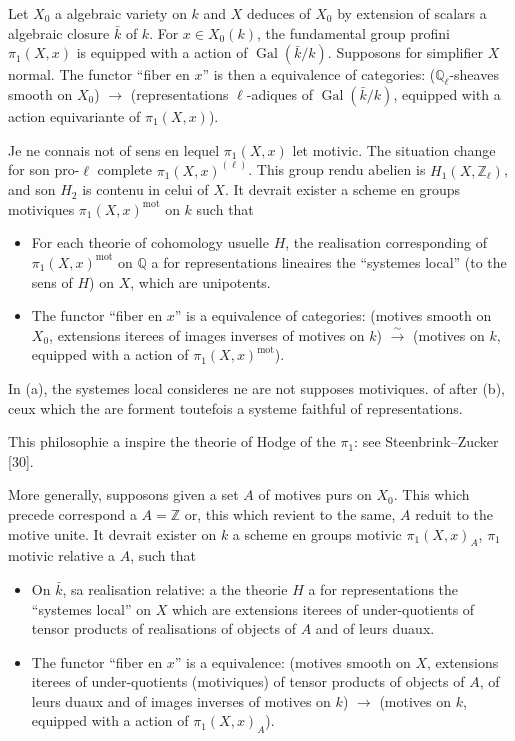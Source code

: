 \documentclass[11pt,a4paper]{article}
\theoremstyle{plain}
\theoremstyle{definition}
\DeclareMathOperator{\Gal}{Gal}
\newcommand{\Q}{\mathbb{Q}}
\newcommand{\Z}{\mathbb{Z}}
\DeclareMathOperator{\mot}{mot}
\begin{document}
Let $X_0$ a algebraic variety on $k$ and $X$ deduces of $X_0$ by extension of scalars a algebraic closure $\bar{k}$ of $k$. For $x \in X_0(k)$, the fundamental group profini $\pi_1(X, x)$ is equipped with a action of $\Gal(\bar{k}/k)$. Supposons for simplifier $X$ normal. The functor ``fiber en $x$'' is then a equivalence of categories: ($\Q_{\ell}$-sheaves smooth on $X_0$) $\to$ (representations $\ell$-adiques of $\Gal(\bar{k}/k)$, equipped with a action equivariante of $\pi_1(X, x)$).

Je ne connais not of sens en lequel $\pi_1(X, x)$ let motivic. The situation change for son pro-$\ell$ complete $\pi_1(X, x)^{(\ell)}$. This group rendu abelien is $H_1(X, \Z_\ell)$, and son $H_2$ is contenu in celui of $X$. It devrait exister a scheme en groups motiviques $\pi_1(X, x)^{\mot}$ on $k$ such that

\begin{itemize}
\item[(a)] For each theorie of cohomology usuelle $H$, the realisation corresponding of $\pi_1(X, x)^{\mot}$ on $\Q$ a for representations lineaires the ``systemes local'' (to the sens of $H$) on $X$, which are unipotents.

\item[(b)] The functor ``fiber en $x$'' is a equivalence of categories: (motives smooth on $X_0$, extensions iterees of images inverses of motives on $k$) $\xrightarrow{\sim}$ (motives on $k$, equipped with a action of $\pi_1(X, x)^{\mot}$).
\end{itemize}

In (a), the systemes local consideres ne are not supposes motiviques. of after (b), ceux which the are forment toutefois a systeme faithful of representations.

This philosophie a inspire the theorie of Hodge of the $\pi_1$: see Steenbrink--Zucker [30].

More generally, supposons given a set $A$ of motives purs on $X_0$. This which precede correspond a $A = \Z$ or, this which revient to the same, $A$ reduit to the motive unite. It devrait exister on $k$ a scheme en groups motivic $\pi_1(X, x)_A$, $\pi_1$ motivic relative a $A$, such that

\begin{itemize}
\item[(a$'$)] On $\bar{k}$, sa realisation relative: a the theorie $H$ a for representations the ``systemes local'' on $X$ which are extensions iterees of under-quotients of tensor products of realisations of objects of $A$ and of leurs duaux.

\item[(b$'$)] The functor ``fiber en $x$'' is a equivalence: (motives smooth on $X$, extensions iterees of under-quotients (motiviques) of tensor products of objects of $A$, of leurs duaux and of images inverses of motives on $k$) $\to$ (motives on $k$, equipped with a action of $\pi_1(X, x)_A$).
\end{itemize}
\end{document}
